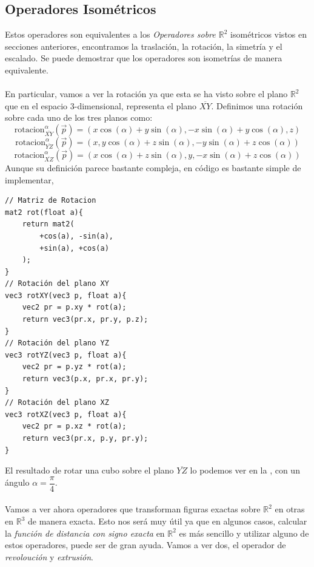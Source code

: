 \subsection{Operadores Isométricos}
Estos operadores son equivalentes a los \textit{Operadores sobre \(\mathbb{R}^2\)} isométricos vistos en secciones anteriores, encontramos la traslación, la rotación, la simetría y el escalado. Se puede demostrar que los operadores son isometrías de manera equivalente.\\\\
En particular, vamos a ver la rotación ya que esta se ha visto sobre el plano \(\mathbb{R}^2\) que en el espacio 3-dimensional, representa el plano \(\overline{XY}\). Definimos una rotación sobre cada uno de los tres planos como:
\[\text{rotacion}_{\overline{XY}}^\alpha(\Vec{p}) = \left(x\cos(\alpha) + y\sin(\alpha),-x\sin(\alpha) + y\cos(\alpha),z\right) \]
\[\text{rotacion}_{\overline{YZ}}^\alpha(\Vec{p}) = \left(x, y\cos(\alpha) + z\sin(\alpha),-y\sin(\alpha) + z\cos(\alpha)\right) \]
\[\text{rotacion}_{\overline{XZ}}^\alpha(\Vec{p}) = \left(x\cos(\alpha) + z\sin(\alpha),y,-x\sin(\alpha) + z\cos(\alpha)\right) \]
Aunque su definición parece bastante compleja, en código es bastante simple de implementar,
\begin{lstlisting}
// Matriz de Rotacion
mat2 rot(float a){
    return mat2(
        +cos(a), -sin(a), 
        +sin(a), +cos(a)
    );
}
// Rotación del plano XY
vec3 rotXY(vec3 p, float a){
    vec2 pr = p.xy * rot(a);
    return vec3(pr.x, pr.y, p.z);
}
// Rotación del plano YZ
vec3 rotYZ(vec3 p, float a){
    vec2 pr = p.yz * rot(a);
    return vec3(p.x, pr.x, pr.y);
}
// Rotación del plano XZ
vec3 rotXZ(vec3 p, float a){
    vec2 pr = p.xz * rot(a);
    return vec3(pr.x, p.y, pr.y);
}
\end{lstlisting}

El resultado de rotar una cubo sobre el plano \(\overline{YZ}\) lo podemos ver en la , con un ángulo \(\alpha=\dfrac{\pi}{4}\).\\\\
Vamos a ver ahora operadores que transforman figuras exactas sobre \(\mathbb{R}^2\) en otras en \(\mathbb{R}^3\) de manera exacta. Esto nos será muy útil ya que en algunos casos, calcular la \textit{función de distancia con signo exacta} en \(\mathbb{R}^2\) es más sencillo y utilizar alguno de estos operadores, puede ser de gran ayuda. Vamos a ver dos, el operador de \textit{revoloución} y \textit{extrusión}.

